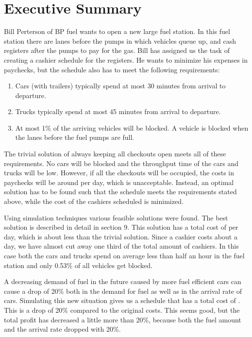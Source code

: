 \section{Executive Summary}
Bill Perterson of BP fuel wants to open a new large fuel station. In this fuel station there are lanes before the pumps in which vehicles queue up, and cash registers after the pumps to pay for the gas.  Bill has assigned us the task of creating a cashier schedule for the registers. He wants to minimize his expenses in paychecks, but the schedule also has to meet the following requirements:

\begin{enumerate}
\item Cars (with  trailers) typically spend at most 30 minutes from arrival to departure.
\item Trucks typically spend at most 45 minutes from arrival to departure.
\item At most 1$\%$ of the arriving vehicles will be blocked. A vehicle is blocked when the lanes before the fuel pumps are full.
\end{enumerate}

\noindent The trivial solution of always keeping all checkouts open meets all of these requirements. 
No cars will be blocked and the throughput time of the cars and trucks will be low.
However, if all the checkouts will be occupied, the costs in paychecks will be around  per day, which is unacceptable.
Instead, an optimal solution has to be found such that the schedule meets the requirements stated above, while the cost of the cashiers scheduled is minimized.

\noindent Using simulation techniques various feasible solutions were found. The best solution is described in detail in section 9. 
This solution has a total cost of  per day, which is about  less than the trivial solution. 
Since a cashier costs about  a day, we have almost cut away one third of the total amount of cashiers. 
In this case both the cars and trucks spend on average less than half an hour in the fuel station and only 0.53\% of all vehicles get blocked.

\noindent A decreasing demand of fuel in the future caused by more fuel efficient cars can cause a drop of 20\% both in the demand for fuel as well as in the arrival rate of cars. Simulating this new situation gives us a schedule that has a total cost of . This is a drop of 20\% compared to the original costs. This seems good, but the total profit has decreased a little more than 20\%, because both the fuel amount and the arrival rate dropped with 20\%.